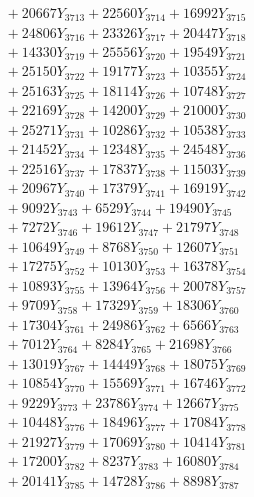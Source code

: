 \documentclass[a4paper,10pt]{article}
\begin{document}
{\begin{align}
&\;  + 20667 Y_{3713} + 22560 Y_{3714} + 16992 Y_{3715} \\[0.3ex]
&\;  + 24806 Y_{3716} + 23326 Y_{3717} + 20447 Y_{3718} \\[0.5ex]\allowbreak
&\;  + 14330 Y_{3719} + 25556 Y_{3720} + 19549 Y_{3721} \\[0.3ex]
&\;  + 25150 Y_{3722} + 19177 Y_{3723} + 10355 Y_{3724} \\[0.3ex]
&\;  + 25163 Y_{3725} + 18114 Y_{3726} + 10748 Y_{3727} \\[0.3ex]
&\;  + 22169 Y_{3728} + 14200 Y_{3729} + 21000 Y_{3730} \\[0.3ex]
&\;  + 25271 Y_{3731} + 10286 Y_{3732} + 10538 Y_{3733} \\[0.3ex]
&\;  + 21452 Y_{3734} + 12348 Y_{3735} + 24548 Y_{3736} \\[0.3ex]
&\;  + 22516 Y_{3737} + 17837 Y_{3738} + 11503 Y_{3739} \\[0.3ex]
&\;  + 20967 Y_{3740} + 17379 Y_{3741} + 16919 Y_{3742} \\[0.3ex]
&\;  + 9092 Y_{3743} + 6529 Y_{3744} + 19490 Y_{3745} \\[0.3ex]
&\;  + 7272 Y_{3746} + 19612 Y_{3747} + 21797 Y_{3748} \\[0.5ex]\allowbreak
&\;  + 10649 Y_{3749} + 8768 Y_{3750} + 12607 Y_{3751} \\[0.3ex]
&\;  + 17275 Y_{3752} + 10130 Y_{3753} + 16378 Y_{3754} \\[0.3ex]
&\;  + 10893 Y_{3755} + 13964 Y_{3756} + 20078 Y_{3757} \\[0.3ex]
&\;  + 9709 Y_{3758} + 17329 Y_{3759} + 18306 Y_{3760} \\[0.3ex]
&\;  + 17304 Y_{3761} + 24986 Y_{3762} + 6566 Y_{3763} \\[0.3ex]
&\;  + 7012 Y_{3764} + 8284 Y_{3765} + 21698 Y_{3766} \\[0.3ex]
&\;  + 13019 Y_{3767} + 14449 Y_{3768} + 18075 Y_{3769} \\[0.3ex]
&\;  + 10854 Y_{3770} + 15569 Y_{3771} + 16746 Y_{3772} \\[0.3ex]
&\;  + 9229 Y_{3773} + 23786 Y_{3774} + 12667 Y_{3775} \\[0.3ex]
&\;  + 10448 Y_{3776} + 18496 Y_{3777} + 17084 Y_{3778} \\[0.5ex]\allowbreak
&\;  + 21927 Y_{3779} + 17069 Y_{3780} + 10414 Y_{3781} \\[0.3ex]
&\;  + 17200 Y_{3782} + 8237 Y_{3783} + 16080 Y_{3784} \\[0.3ex]
&\;  + 20141 Y_{3785} + 14728 Y_{3786} + 8898 Y_{3787} \\[0.3ex]

\end{align}}
\end{document}
